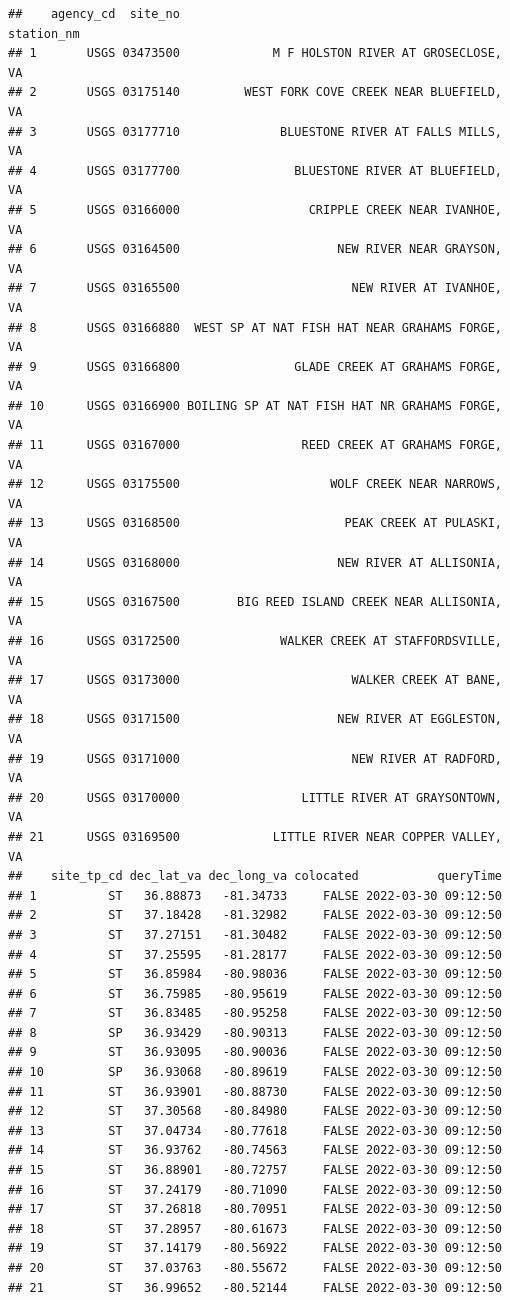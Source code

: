 \documentclass[
]{book}
\begin{document}
\begin{verbatim}
##    agency_cd  site_no                                      station_nm
## 1       USGS 03473500             M F HOLSTON RIVER AT GROSECLOSE, VA
## 2       USGS 03175140         WEST FORK COVE CREEK NEAR BLUEFIELD, VA
## 3       USGS 03177710              BLUESTONE RIVER AT FALLS MILLS, VA
## 4       USGS 03177700                BLUESTONE RIVER AT BLUEFIELD, VA
## 5       USGS 03166000                  CRIPPLE CREEK NEAR IVANHOE, VA
## 6       USGS 03164500                      NEW RIVER NEAR GRAYSON, VA
## 7       USGS 03165500                        NEW RIVER AT IVANHOE, VA
## 8       USGS 03166880  WEST SP AT NAT FISH HAT NEAR GRAHAMS FORGE, VA
## 9       USGS 03166800                GLADE CREEK AT GRAHAMS FORGE, VA
## 10      USGS 03166900 BOILING SP AT NAT FISH HAT NR GRAHAMS FORGE, VA
## 11      USGS 03167000                 REED CREEK AT GRAHAMS FORGE, VA
## 12      USGS 03175500                     WOLF CREEK NEAR NARROWS, VA
## 13      USGS 03168500                       PEAK CREEK AT PULASKI, VA
## 14      USGS 03168000                      NEW RIVER AT ALLISONIA, VA
## 15      USGS 03167500        BIG REED ISLAND CREEK NEAR ALLISONIA, VA
## 16      USGS 03172500              WALKER CREEK AT STAFFORDSVILLE, VA
## 17      USGS 03173000                        WALKER CREEK AT BANE, VA
## 18      USGS 03171500                      NEW RIVER AT EGGLESTON, VA
## 19      USGS 03171000                        NEW RIVER AT RADFORD, VA
## 20      USGS 03170000                 LITTLE RIVER AT GRAYSONTOWN, VA
## 21      USGS 03169500             LITTLE RIVER NEAR COPPER VALLEY, VA
##    site_tp_cd dec_lat_va dec_long_va colocated           queryTime
## 1          ST   36.88873   -81.34733     FALSE 2022-03-30 09:12:50
## 2          ST   37.18428   -81.32982     FALSE 2022-03-30 09:12:50
## 3          ST   37.27151   -81.30482     FALSE 2022-03-30 09:12:50
## 4          ST   37.25595   -81.28177     FALSE 2022-03-30 09:12:50
## 5          ST   36.85984   -80.98036     FALSE 2022-03-30 09:12:50
## 6          ST   36.75985   -80.95619     FALSE 2022-03-30 09:12:50
## 7          ST   36.83485   -80.95258     FALSE 2022-03-30 09:12:50
## 8          SP   36.93429   -80.90313     FALSE 2022-03-30 09:12:50
## 9          ST   36.93095   -80.90036     FALSE 2022-03-30 09:12:50
## 10         SP   36.93068   -80.89619     FALSE 2022-03-30 09:12:50
## 11         ST   36.93901   -80.88730     FALSE 2022-03-30 09:12:50
## 12         ST   37.30568   -80.84980     FALSE 2022-03-30 09:12:50
## 13         ST   37.04734   -80.77618     FALSE 2022-03-30 09:12:50
## 14         ST   36.93762   -80.74563     FALSE 2022-03-30 09:12:50
## 15         ST   36.88901   -80.72757     FALSE 2022-03-30 09:12:50
## 16         ST   37.24179   -80.71090     FALSE 2022-03-30 09:12:50
## 17         ST   37.26818   -80.70951     FALSE 2022-03-30 09:12:50
## 18         ST   37.28957   -80.61673     FALSE 2022-03-30 09:12:50
## 19         ST   37.14179   -80.56922     FALSE 2022-03-30 09:12:50
## 20         ST   37.03763   -80.55672     FALSE 2022-03-30 09:12:50
## 21         ST   36.99652   -80.52144     FALSE 2022-03-30 09:12:50
\end{verbatim}
\end{document}
